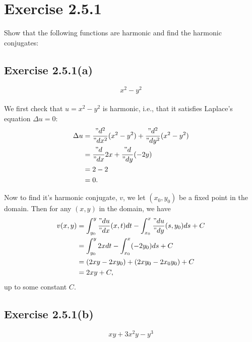 \documentclass[12pt]{article}
\newenvironment{problem}
    {\begin{lrbox}{\mybox}\begin{minipage}{\textwidth-10pt}}
    {\end{minipage}\end{lrbox}\framebox[6.5in]{\usebox{\mybox}}}
\newcommand{\pd}[2]{\frac{"d#1}{"d#2}}
\newcommand{\pdn}[3]{\frac{"d^{#3}#1}{"d#2^{#3}}}
\begin{document}
\newpage
\section*{Exercise 2.5.1}
\begin{problem}
    Show that the following functions are harmonic and find the harmonic conjugates:
\end{problem}

\subsection*{Exercise 2.5.1(a)}
\begin{problem}
    \[x^2-y^2\]
\end{problem}
\paragraph{}

We first check that $u=x^2-y^2$ is harmonic, i.e., that it satisfies Laplace's equation $\Delta u=0$:
\begin{align*}
    \Delta u 
        &= \pdn{}{x}{2}(x^2-y^2) + \pdn{}{y}{2}(x^2-y^2) \\
        &= \pd{}{x}2x + \pd{}{y}(-2y) \\
        &= 2 - 2 \\
        &= 0.
\end{align*}

Now to find it's harmonic conjugate, $v$, we let $(x_0,y_0)$ be a fixed point in the domain. Then for any $(x,y)$ in the domain, we have
\begin{align*}
    v(x,y)
        &= \int_{y_0}^y\pd ux (x,t) dt - \int_{x_0}^x\pd uy (s,y_0)ds + C \\
        &= \int_{y_0}^y2x dt - \int_{x_0}^x(-2y_0)ds + C \\
        &= (2xy - 2xy_0) + (2xy_0 - 2x_0y_0) + C \\
        &= 2xy + C,
\end{align*}
up to some constant $C$.


\subsection*{Exercise 2.5.1(b)}
\begin{problem}
    \[xy+3x^2y-y^3\]
\end{problem}
\paragraph{}
\end{document}
